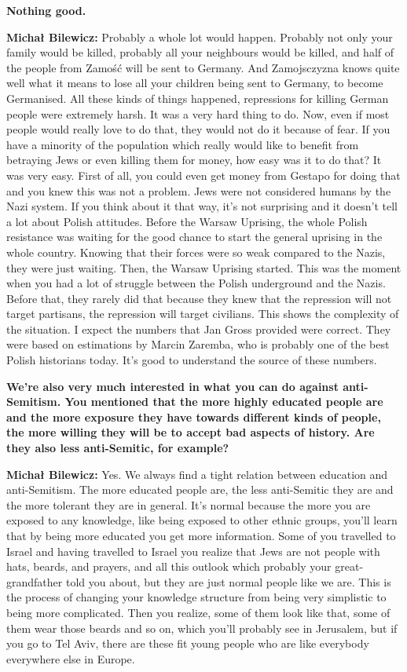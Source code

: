 \textbf{Nothing good.}

\textbf{Michał Bilewicz:} Probably a whole lot would happen. Probably not only your family would be killed, probably all your neighbours would be killed, and half of the people from Zamość will be sent to Germany. And Zamojsczyzna knows quite well what it means to lose all your children being sent to Germany, to become Germanised. All these kinds of things happened, repressions for killing German people were extremely harsh. It was a very hard thing to do. Now, even if most people would really love to do that, they would not do it because of fear. If you have a minority of the population which really would like to benefit from betraying Jews or even killing them for money, how easy was it to do that? It was very easy. First of all, you could even get money from Gestapo for doing that and you knew this was not a problem. Jews were not considered humans by the Nazi system. If you think about it that way, it’s not surprising and it doesn’t tell a lot about Polish attitudes. Before the Warsaw Uprising, the whole Polish resistance was waiting for the good chance to start the general uprising in the whole country. Knowing that their forces were so weak compared to the Nazis, they were just waiting. Then, the Warsaw Uprising started. This was the moment when you had a lot of struggle between the Polish underground and the Nazis. Before that, they rarely did that because they knew that the repression will not target partisans, the repression will target civilians. This shows the complexity of the situation. I expect the numbers that Jan Gross provided were correct. They were based on estimations by Marcin Zaremba, who is probably one of the best Polish historians today. It’s good to understand the source of these numbers.  

\textbf{We’re also very much interested in what you can do against anti-Semitism. You mentioned that the more highly educated people are and the more exposure they have towards different kinds of people, the more willing they will be to accept bad aspects of history. Are they also less anti-Semitic, for example?} 

\textbf{Michał Bilewicz:} Yes. We always find a tight relation between education and anti-Semitism. The more educated people are, the less anti-Semitic they are and the more tolerant they are in general. It’s normal because the more you are exposed to any knowledge, like being exposed to other ethnic groups, you'll learn that by being more educated you get more information. Some of you travelled to Israel and having travelled to Israel you realize that Jews are not people with hats, beards, and prayers, and all this outlook which probably your great-grandfather told you about, but they are just normal people like we are. This is the process of changing your knowledge structure from being very simplistic to being more complicated. Then you realize, some of them look like that, some of them wear those beards and so on, which you'll probably see in Jerusalem, but if you go to Tel Aviv, there are these fit young people who are like everybody everywhere else in Europe. 

